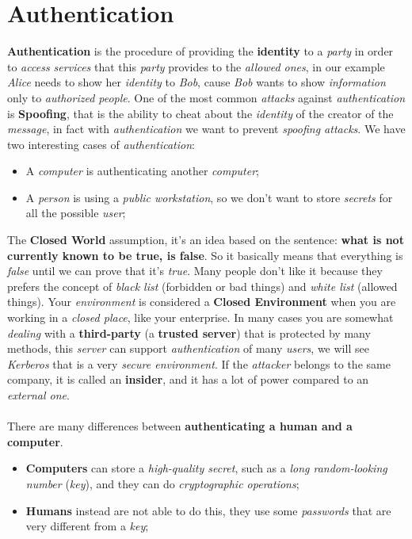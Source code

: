 \documentclass{article}
\begin{document}
\section{Authentication}
\textbf{Authentication} is the procedure of providing the \textbf{identity} to a \emph{party} in order to \emph{access services} that this \emph{party} provides to the \emph{allowed ones}, in our example \emph{Alice} needs to show her \emph{identity} to \emph{Bob}, cause \emph{Bob} wants to show \emph{information} only to \emph{authorized people}. One of the most common \emph{attacks} against \emph{authentication} is \textbf{Spoofing}, that is the ability to cheat about the \emph{identity} of the creator of the \emph{message}, in fact with \emph{authentication} we want to prevent \emph{spoofing attacks}. We have two interesting cases of \emph{authentication}:
\begin{itemize}
\item A \emph{computer} is authenticating another \emph{computer}; 
\item A \emph{person} is using a \emph{public workstation}, so we don't want to store \emph{secrets} for all the possible \emph{user};
\end{itemize}
The \textbf{Closed World} assumption, it's an idea based on the sentence: \textbf{what is not currently known to be true, is false}. So it basically means that everything is \emph{false} until we can prove that it's \emph{true}. Many people don’t like it because they prefers the concept of\emph{ black list} (forbidden or bad things) and \emph{white list} (allowed things). Your \emph{environment} is considered a \textbf{Closed Environment} when you are working in a \emph{closed place}, like your enterprise. In many cases you are somewhat \emph{dealing} with a \textbf{third-party} (a \textbf{trusted server}) that is protected by many methods, this \emph{server} can support \emph{authentication} of many \emph{users}, we will see \emph{Kerberos} that is a very \emph{secure environment}. If the \emph{attacker} belongs to the same company, it is called an \textbf{insider}, and it has a lot of power compared to an \emph{external one}. \\\\
There are many differences between \textbf{authenticating a human and a computer}. 
\begin{itemize}
\item \textbf{Computers} can store a \emph{high-quality secret}, such as a \emph{long random-looking number} (\emph{key}), and they can do \emph{cryptographic operations};
\item \textbf{Humans} instead are not able to do this, they use some \emph{passwords} that are very different from a \emph{key};
\end{itemize}
\end{document}
